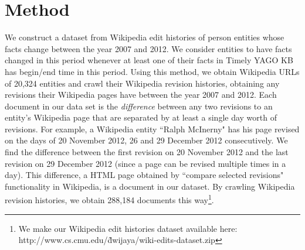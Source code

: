 \section{Method} \label{sec:method}

We construct a dataset from Wikipedia edit histories of person entities whose facts change between the year 2007 and 2012. We consider entities to have facts changed in this period whenever at least one of their facts in Timely YAGO KB \cite{wang2010timely} has begin/end time in this period. Using this method, we obtain Wikipedia URLs of 20,324 entities and crawl their Wikipedia revision histories, obtaining any revisions their Wikipedia pages have between the year 2007 and 2012. Each document in our data set is the \textit{difference} between any two revisions to an entity's Wikipedia page that are separated by at least a single day worth of revisions. For example, a Wikipedia entity ``Ralph McInerny" has his page revised on the days of 20 November 2012, 26 and 29 December 2012 consecutively. We find the difference between the first revision on 20 November 2012 and the last revision on 29 December 2012 (since a page can be revised multiple times in a day). This difference, a HTML page obtained by ``compare selected revisions"  functionality in Wikipedia, is a document in our dataset. By crawling Wikipedia revision histories, we obtain 288,184 documents this way\footnote[1]{We make our Wikipedia edit histories dataset available here: http://www.cs.cmu.edu/\~dwijaya/wiki-edits-dataset.zip}. 






